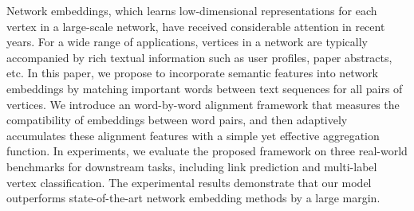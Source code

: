 Network embeddings, which learns low-dimensional representations for each vertex in a large-scale network, have received considerable attention in recent years. For a wide range of applications, vertices in a network are typically accompanied by rich textual information such as user profiles, paper abstracts, etc. In this paper, we propose to incorporate semantic features into network embeddings by matching important words between text sequences for all pairs of vertices. We introduce an word-by-word alignment framework that measures the compatibility of embeddings between word pairs, and then adaptively accumulates these alignment features with a simple yet effective aggregation function. In experiments, we evaluate the proposed framework on three real-world benchmarks for downstream tasks, including link prediction and multi-label vertex classification. The experimental results demonstrate that our model outperforms state-of-the-art network embedding methods by a large margin.
